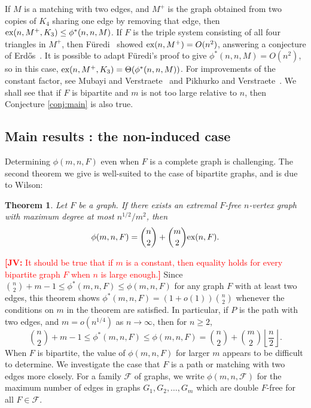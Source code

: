 \documentclass[12pt]{article}
\newcommand{\jv}[1]{\textcolor{red}{\textbf{[JV: } #1\textbf{]}}}
\newtheorem{theorem}{Theorem}
\newcommand*{\ex}{\textnormal{ex}}
\begin{document}
If $M$ is a matching with two edges, and $M^+$ is the graph obtained from two copies of $K_4$ sharing one edge by removing that edge, then $\ex(n,M^+,K_3) \leq \phi^*(n,n,M)$. If $F$ is the triple system consisting of all four triangles in $M^+$, then F\"{u}redi~\cite{Furedi1984} showed $\ex(n,M^+) = O(n^2)$, answering a conjecture of Erd\H{o}s~\cite{Erdos1977}. It is possible to adapt F\"{u}redi's proof to give $\phi^*(n,n,M) = O(n^2)$, so in this case, $\ex(n,M^+,K_3) = \Theta(\phi^*(n,n,M))$. For improvements of the constant factor, see Mubayi and Verstraete~\cite{MubayiV2004} and Pikhurko and Verstraete~\cite{PikhurkoV2009}. We shall see that if $F$ is bipartite and $m$ is not too large relative to $n$, then Conjecture \ref{conj:main} is also true. 

\subsection{Main results : the non-induced case}

Determining $\phi(m,n,F)$ even when $F$ is a complete graph is challenging. The second theorem we give is well-suited to the case of bipartite graphs, and is due to Wilson:

\begin{theorem}\label{wilsontheorem}
    Let $F$ be a graph. 
    If
there exists an extremal $F$-free $n$-vertex graph with maximum degree at most $n^{1/2}/m^2$, then 
  \[ \phi(m,n,F) = \binom{n}{2} + \binom{m}{2}\ex(n,F).\]
\end{theorem}

\jv{It should be true that if $m$ is a constant, then  equality holds for every bipartite graph $F$ when $n$ is large enough.}
Since $\binom{n}{2} + m - 1 \leq \phi^*(m,n,F) \leq \phi(m,n,F)$ for any graph $F$ with at least two edges, this theorem shows $\phi^*(m,n,F) = (1 + o(1))\binom{n}{2}$ whenever the conditions on $m$ in the theorem are satisfied. In particular, if $P$ is the path with two edges, and $m = o(n^{1/4})$ as $n \rightarrow \infty$, then for $n \geq 2$, 
\[ \binom{n}{2} + m - 1 \leq \phi^*(m,n,F) \leq \phi(m,n,F) = \binom{n}{2} + \binom{m}{2} \left\lfloor \frac{n}{2}\right\rfloor. \]
When $F$ is bipartite, the value of $\phi(m,n,F)$ for larger $m$ appears to be difficult to determine. We investigate the case that $F$ is a path or matching with two edges more closely. For a family $\mathcal{F}$ of graphs, we write $\phi(m,n,\mathcal{F})$ for the maximum number of edges in graphs $G_1,G_2,\dots,G_m$ which are double $F$-free for all $F \in \mathcal{F}$. 
\end{document}
